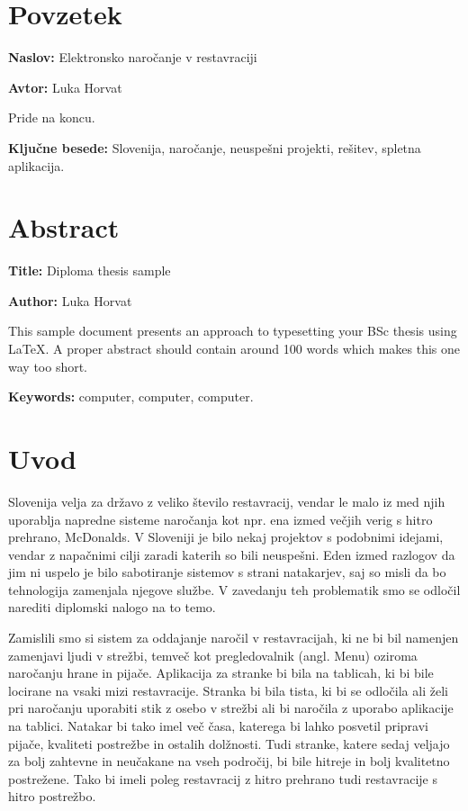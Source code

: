 \documentclass[a4paper, 12pt]{book}
\newcommand{\ttitle}{Elektronsko naročanje v restavraciji}
\newcommand{\ttitleEn}{Diploma thesis sample}
\newcommand{\tauthor}{Luka Horvat}
\newcommand{\tkeywords}{Slovenija, naročanje, neuspešni projekti, rešitev, spletna aplikacija}
\newcommand{\tkeywordsEn}{computer, computer, computer}
\newcommand{\clearemptydoublepage}{\newpage{\pagestyle{empty}\cleardoublepage}}
\begin{document}
\clearemptydoublepage

\chapter*{Povzetek}

\noindent\textbf{Naslov:} \ttitle
\bigskip

\noindent\textbf{Avtor:} \tauthor
\bigskip

\noindent 
Pride na koncu.

\noindent\textbf{Ključne besede:} \tkeywords.
\clearemptydoublepage

\chapter*{Abstract}

\noindent\textbf{Title:} \ttitleEn
\bigskip

\noindent\textbf{Author:} \tauthor
\bigskip

\noindent This sample document presents an approach to typesetting your BSc thesis using \LaTeX. 
A proper abstract should contain around 100 words which makes this one way too short.
\bigskip

\noindent\textbf{Keywords:} \tkeywordsEn.
\clearemptydoublepage

\mainmatter
\setcounter{page}{1}
\pagestyle{fancy}

\chapter{Uvod}
Slovenija velja za državo z veliko število restavracij, vendar le malo iz med njih uporablja napredne sisteme naročanja kot npr. ena izmed večjih verig s hitro prehrano, McDonalds. V Sloveniji je bilo nekaj projektov s podobnimi idejami, vendar z napačnimi cilji zaradi katerih so bili neuspešni. Eden izmed razlogov da jim ni uspelo je bilo sabotiranje sistemov s strani natakarjev, saj so misli da bo tehnologija zamenjala njegove službe. V zavedanju teh problematik smo se odločil narediti diplomski nalogo na to temo. 

Zamislili smo si sistem za oddajanje naročil v restavracijah, ki ne bi bil namenjen zamenjavi ljudi v strežbi, temveč kot pregledovalnik (angl. Menu) oziroma naročanju hrane in pijače. Aplikacija za stranke bi bila na tablicah, ki bi bile locirane na vsaki mizi restavracije. Stranka bi bila tista, ki bi se odločila ali želi pri naročanju uporabiti stik z osebo v strežbi ali bi naročila z uporabo aplikacije na tablici. Natakar bi tako imel več časa, katerega bi lahko posvetil pripravi pijače, kvaliteti postrežbe in ostalih dolžnosti. Tudi stranke, katere sedaj veljajo za bolj zahtevne in neučakane na vseh področij, bi bile hitreje in bolj kvalitetno postrežene. Tako bi imeli poleg restavracij z hitro prehrano tudi restavracije s hitro postrežbo. 
\end{document}
